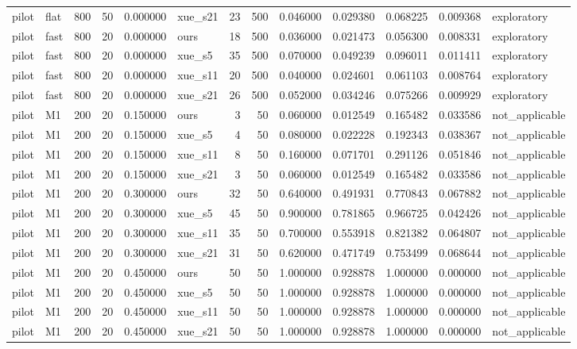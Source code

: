 \begin{longtable}{llrrrlrrrrrrl}
pilot & flat & 800 & 50 & 0.000000 & xue\_s21 & 23 & 500 & 0.046000 & 0.029380 & 0.068225 & 0.009368 & exploratory \\
pilot & fast & 800 & 20 & 0.000000 & ours & 18 & 500 & 0.036000 & 0.021473 & 0.056300 & 0.008331 & exploratory \\
pilot & fast & 800 & 20 & 0.000000 & xue\_s5 & 35 & 500 & 0.070000 & 0.049239 & 0.096011 & 0.011411 & exploratory \\
pilot & fast & 800 & 20 & 0.000000 & xue\_s11 & 20 & 500 & 0.040000 & 0.024601 & 0.061103 & 0.008764 & exploratory \\
pilot & fast & 800 & 20 & 0.000000 & xue\_s21 & 26 & 500 & 0.052000 & 0.034246 & 0.075266 & 0.009929 & exploratory \\
pilot & M1 & 200 & 20 & 0.150000 & ours & 3 & 50 & 0.060000 & 0.012549 & 0.165482 & 0.033586 & not\_applicable \\
pilot & M1 & 200 & 20 & 0.150000 & xue\_s5 & 4 & 50 & 0.080000 & 0.022228 & 0.192343 & 0.038367 & not\_applicable \\
pilot & M1 & 200 & 20 & 0.150000 & xue\_s11 & 8 & 50 & 0.160000 & 0.071701 & 0.291126 & 0.051846 & not\_applicable \\
pilot & M1 & 200 & 20 & 0.150000 & xue\_s21 & 3 & 50 & 0.060000 & 0.012549 & 0.165482 & 0.033586 & not\_applicable \\
pilot & M1 & 200 & 20 & 0.300000 & ours & 32 & 50 & 0.640000 & 0.491931 & 0.770843 & 0.067882 & not\_applicable \\
pilot & M1 & 200 & 20 & 0.300000 & xue\_s5 & 45 & 50 & 0.900000 & 0.781865 & 0.966725 & 0.042426 & not\_applicable \\
pilot & M1 & 200 & 20 & 0.300000 & xue\_s11 & 35 & 50 & 0.700000 & 0.553918 & 0.821382 & 0.064807 & not\_applicable \\
pilot & M1 & 200 & 20 & 0.300000 & xue\_s21 & 31 & 50 & 0.620000 & 0.471749 & 0.753499 & 0.068644 & not\_applicable \\
pilot & M1 & 200 & 20 & 0.450000 & ours & 50 & 50 & 1.000000 & 0.928878 & 1.000000 & 0.000000 & not\_applicable \\
pilot & M1 & 200 & 20 & 0.450000 & xue\_s5 & 50 & 50 & 1.000000 & 0.928878 & 1.000000 & 0.000000 & not\_applicable \\
pilot & M1 & 200 & 20 & 0.450000 & xue\_s11 & 50 & 50 & 1.000000 & 0.928878 & 1.000000 & 0.000000 & not\_applicable \\
pilot & M1 & 200 & 20 & 0.450000 & xue\_s21 & 50 & 50 & 1.000000 & 0.928878 & 1.000000 & 0.000000 & not\_applicable \\

\end{longtable}
